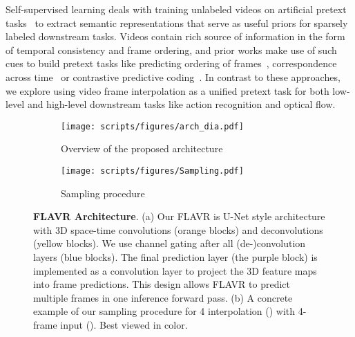 \documentclass[10pt,twocolumn,letterpaper]{article}
\begin{document}
Self-supervised learning deals with training unlabeled videos on artificial pretext tasks~\cite{doersch2015unsupervised} to extract semantic representations that serve as useful priors for sparsely labeled downstream tasks. Videos contain rich source of information in the form of temporal consistency and frame ordering, and prior works make use of such cues to build pretext tasks like predicting ordering of frames~\cite{xu2019self, lee2017unsupervised, fernando2017self, misra2016shuffle, wei2018learning}, 
correspondence across time~\cite{jayaraman2016slow, wang2015unsupervised} or contrastive predictive coding~\cite{han2019video, han2020memory}. In contrast to these approaches, we explore using video frame interpolation as a unified pretext task for both low-level and high-level downstream tasks like action recognition and optical flow.




\begin{figure*}
     \begin{center}
     \begin{subfigure}[b]{0.49\textwidth}
        \centering
        \texttt{[image: scripts/figures/arch\_dia.pdf]}
        \captionsetup{width=\textwidth}
        \caption{Overview of the proposed architecture}
        \label{fig:arch}
     \end{subfigure}
     \hfill
     \begin{subfigure}[b]{0.49\textwidth}
        \centering
        \texttt{[image: scripts/figures/Sampling.pdf]}
        \caption{Sampling procedure}
        \label{fig:sampling}
     \end{subfigure}
     \end{center}
\vspace{-12pt}
\caption{{\bf FLAVR Architecture}. (a) Our FLAVR is U-Net style architecture with 3D space-time convolutions (orange blocks) and deconvolutions (yellow blocks). We use channel gating after all (de-)convolution layers (blue blocks). The final prediction layer (the purple block) is implemented as a convolution layer to project the 3D feature maps into  frame predictions. This design allows FLAVR to predict multiple frames in one inference forward pass. (b) A concrete example of our sampling procedure for 4 interpolation () with 4-frame input (). Best viewed in color.} 
\vspace{-8pt}
\label{fig:architecture}
\end{figure*}
\end{document}

